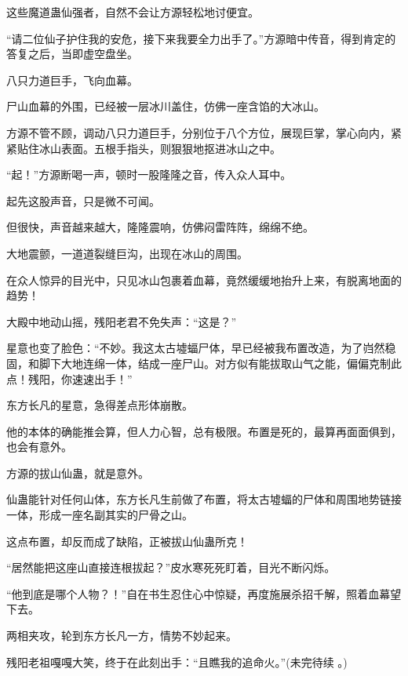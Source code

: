 \begin{this_body}
这些魔道蛊仙强者，自然不会让方源轻松地讨便宜。

“请二位仙子护住我的安危，接下来我要全力出手了。”方源暗中传音，得到肯定的答复之后，当即虚空盘坐。

八只力道巨手，飞向血幕。

尸山血幕的外围，已经被一层冰川盖住，仿佛一座含馅的大冰山。

方源不管不顾，调动八只力道巨手，分别位于八个方位，展现巨掌，掌心向内，紧紧贴住冰山表面。五根手指头，则狠狠地抠进冰山之中。

“起！”方源断喝一声，顿时一股隆隆之音，传入众人耳中。

起先这股声音，只是微不可闻。

但很快，声音越来越大，隆隆震响，仿佛闷雷阵阵，绵绵不绝。

大地震颤，一道道裂缝巨沟，出现在冰山的周围。

在众人惊异的目光中，只见冰山包裹着血幕，竟然缓缓地抬升上来，有脱离地面的趋势！

大殿中地动山摇，残阳老君不免失声：“这是？”

星意也变了脸色：“不妙。我这太古墟蝠尸体，早已经被我布置改造，为了岿然稳固，和脚下大地连绵一体，结成一座尸山。对方似有能拔取山气之能，偏偏克制此点！残阳，你速速出手！”

东方长凡的星意，急得差点形体崩散。

他的本体的确能推会算，但人力心智，总有极限。布置是死的，最算再面面俱到，也会有意外。

方源的拔山仙蛊，就是意外。

仙蛊能针对任何山体，东方长凡生前做了布置，将太古墟蝠的尸体和周围地势链接一体，形成一座名副其实的尸骨之山。

这点布置，却反而成了缺陷，正被拔山仙蛊所克！

“居然能把这座山直接连根拔起？”皮水寒死死盯着，目光不断闪烁。

“他到底是哪个人物？！”自在书生忍住心中惊疑，再度施展杀招千解，照着血幕望下去。

两相夹攻，轮到东方长凡一方，情势不妙起来。

残阳老祖嘎嘎大笑，终于在此刻出手：“且瞧我的追命火。”(未完待续 。)

\end{this_body}

